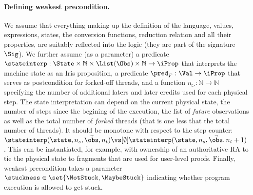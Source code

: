 \paragraph{Defining weakest precondition.}
We assume that everything making up the definition of the language, \ie values, expressions, states, the conversion functions, reduction relation and all their properties, are suitably reflected into the logic (\ie they are part of the signature $\Sig$).
We further assume (as a parameter) a predicate $\stateinterp : \State \times \mathbb N \times \List(\Obs) \times \mathbb N \to \iProp$ that interprets the machine state as an Iris proposition, a predicate $\pred_F: \Val \to \iProp$ that serves as postcondition for forked-off threads, and a function $n_\rhd: \mathbb N \to \mathbb N$ specifying the number of additional laters and later credits used for each physical step.
The state interpretation can depend on the current physical state, the number of steps since the begining of the execution, the list of \emph{future} observations as well as the total number of \emph{forked} threads (that is one less that the total number of threads).
It should be monotone with respect to the step counter: $\stateinterp(\state, n_s, \vec\obs, n_t) \vs[\emptyset] \stateinterp(\state, n_s, \vec\obs, n_t + 1)$.
This can be instantiated, for example, with ownership of an authoritative RA to tie the physical state to fragments that are used for user-level proofs.
Finally, weakest precondition takes a parameter $\stuckness \in \set{\NotStuck, \MaybeStuck}$ indicating whether program execution is allowed to get stuck.

